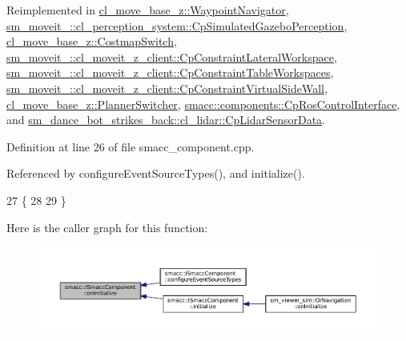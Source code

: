 Reimplemented in \hyperlink{classcl__move__base__z_1_1WaypointNavigator_ac60ecf63f7a2a84f3ef51f04cc222a70}{cl\+\_\+move\+\_\+base\+\_\+z\+::\+Waypoint\+Navigator}, \hyperlink{classsm__moveit__4_1_1cl__perception__system_1_1CpSimulatedGazeboPerception_adebc30f6b1fc905f783de3f7bdf4a711}{sm\+\_\+moveit\+\_\+::cl\+\_\+perception\+\_\+system\+::\+Cp\+Simulated\+Gazebo\+Perception}, \hyperlink{classcl__move__base__z_1_1CostmapSwitch_ad4d125cd563ed0bb76d27226bc47e63e}{cl\+\_\+move\+\_\+base\+\_\+z\+::\+Costmap\+Switch}, \hyperlink{classsm__moveit__4_1_1cl__moveit__z__client_1_1CpConstraintLateralWorkspace_a78085a604bdc75b6678825580a79b304}{sm\+\_\+moveit\+\_\+::cl\+\_\+moveit\+\_\+z\+\_\+client\+::\+Cp\+Constraint\+Lateral\+Workspace}, \hyperlink{classsm__moveit__4_1_1cl__moveit__z__client_1_1CpConstraintTableWorkspaces_aa52f8dee255d522b82f13f25f1ed65a8}{sm\+\_\+moveit\+\_\+::cl\+\_\+moveit\+\_\+z\+\_\+client\+::\+Cp\+Constraint\+Table\+Workspaces}, \hyperlink{classsm__moveit__4_1_1cl__moveit__z__client_1_1CpConstraintVirtualSideWall_a790ff97860037f8587d1ef92752219b0}{sm\+\_\+moveit\+\_\+::cl\+\_\+moveit\+\_\+z\+\_\+client\+::\+Cp\+Constraint\+Virtual\+Side\+Wall}, \hyperlink{classcl__move__base__z_1_1PlannerSwitcher_a36bc2b9788f03a1ca02b954c625ef4c5}{cl\+\_\+move\+\_\+base\+\_\+z\+::\+Planner\+Switcher}, \hyperlink{classsmacc_1_1components_1_1CpRosControlInterface_a469bdb5723a9ab66d6b0a7908d5891bf}{smacc\+::components\+::\+Cp\+Ros\+Control\+Interface}, and \hyperlink{classsm__dance__bot__strikes__back_1_1cl__lidar_1_1CpLidarSensorData_a138dad9a855d5d4962410374d0a29d30}{sm\+\_\+dance\+\_\+bot\+\_\+strikes\+\_\+back\+::cl\+\_\+lidar\+::\+Cp\+Lidar\+Sensor\+Data}.



Definition at line 26 of file smacc\+\_\+component.\+cpp.



Referenced by configure\+Event\+Source\+Types(), and initialize().


\begin{DoxyCode}
27 \{
28 
29 \}
\end{DoxyCode}
Here is the caller graph for this function\+:
\nopagebreak
\begin{figure}[H]
\begin{center}
\leavevmode
\includegraphics[width=350pt]{classsmacc_1_1ISmaccComponent_ae6f71d008db12553912e9436184b9e65_icgraph}
\end{center}
\end{figure}
\mbox{\label{classsmacc_1_1ISmaccComponent_a687dead5b87a3b9781b9bf6ab0b7afa5}} 
